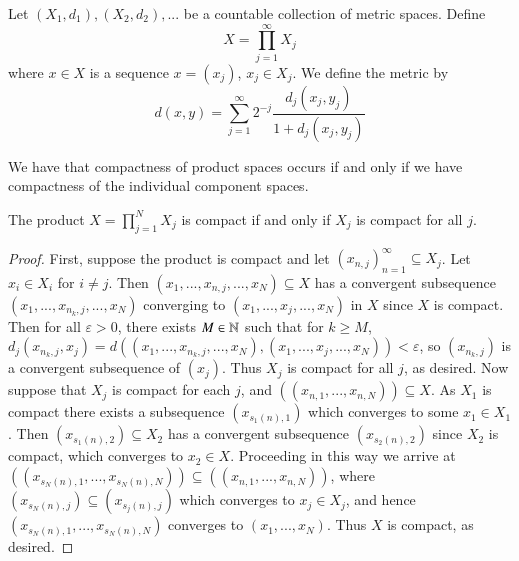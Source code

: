 \begin{defn}
    Let $(X_1,d_1),(X_2,d_2),...$ be a countable collection of metric spaces. Define $$X = \prod_{j=1}^{\infty}X_j$$ where $x \in X$ is a sequence $x = (x_j)$, $x_j \in X_j$. We define the metric by $$d(x,y) = \sum_{j=1}^{\infty}2^{-j}\frac{d_j(x_j,y_j)}{1+d_j(x_j,y_j)}$$
\end{defn}

We have that compactness of product spaces occurs if and only if we have compactness of the individual component spaces.

\begin{prop}
    The product $X = \prod_{j=1}^NX_j$ is compact if and only if $X_j$ is compact for all $j$.
\end{prop}
\begin{proof}
    First, suppose the product is compact and let $(x_{n,j})_{n=1}^{\infty} \subseteq X_j$. Let $x_i \in X_i$ for $i \neq j$. Then $(x_1,...,x_{n,j},...,x_N) \subseteq X$ has a convergent subsequence $(x_1,...,x_{n_k,j},...,x_N)$ converging to $(x_1,...,x_j,...,x_N)$ in $X$ since $X$ is compact. Then for all $\varepsilon > 0$, there exists $M \in \mathbb N$ such that for $k \geq M$, $d_j(x_{n_k,j},x_j) = d((x_1,...,x_{n_k,j},...,x_N),(x_1,...,x_j,...,x_N)) < \varepsilon$, so $(x_{n_k,j})$ is a convergent subsequence of $(x_j)$. Thus $X_j$ is compact for all $j$, as desired. Now suppose that $X_j$ is compact for each $j$, and $((x_{n,1},...,x_{n,N})) \subseteq X$. As $X_1$ is compact there exists a subsequence $(x_{s_1(n),1})$ which converges to some $x_1 \in X_1$. Then $(x_{s_1(n),2}) \subseteq X_2$ has a convergent subsequence $(x_{s_2(n),2})$ since $X_2$ is compact, which converges to $x_2 \in X$. Proceeding in this way we arrive at $((x_{s_N(n),1},...,x_{s_N(n),N})) \subseteq ((x_{n,1},...,x_{n,N}))$, where $(x_{s_N(n),j}) \subseteq (x_{s_j(n),j})$ which converges to $x_j \in X_j$, and hence $(x_{s_N(n),1},...,x_{s_N(n),N})$ converges to $(x_1,...,x_N)$. Thus $X$ is compact, as desired.
\end{proof}


